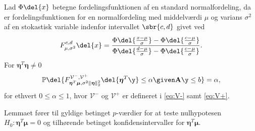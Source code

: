 \begin{lem}  \label{lem:lem2}
Lad \(\Phi \del{x}\) betegne fordelingsfunktionen af en standard normalfordeling, da er fordelingsfunktionen for en normalfordeling med middelværdi \(\mu\) og varians \(\sigma^2\) af en stokastisk variable indenfor intervallet \(\sbr{c,d}\) givet ved
\begin{align*}
F_{\mu, \sigma^2}^{c,d} \del{x} = \frac{\Phi\del{\frac{x-\mu}{\sigma}} - \Phi\del{\frac{c-\mu}{\sigma}}}{\Phi\del{\frac{d-\mu}{\sigma}} - \Phi\del{\frac{c-\mu}{\sigma}}}.
\end{align*}
For \(\boldsymbol{\eta}^T \boldsymbol{\eta} \neq 0\)
\begin{align*}
\mathbb{P} \del{F_{\boldsymbol{\eta}^T \boldsymbol{\mu}, \sigma^2 \Vert \boldsymbol{\eta} \Vert_2^2}^{\mathcal{V}^-, \mathcal{V}^+} \del{\boldsymbol{\eta}^T \y} \leq \alpha \given \mathbf{A} \y \leq b} = \alpha, 
\end{align*}
for ethvert \(0 \leq \alpha \leq 1\), hvor \(\mathcal{V}^-\) og \(\mathcal{V}^+\) er defineret i \eqref{eq:V-} samt \eqref{eq:V+}. 
\end{lem}
%
Lemmaet fører til gyldige betinget \(p\)-værdier for at teste nulhypotesen \(H_0: \boldsymbol{\eta}^T \boldsymbol{\mu}=0\) og tilhørende betinget konfidensintervaller for \(\boldsymbol{\eta}^T \boldsymbol{\mu}\).

